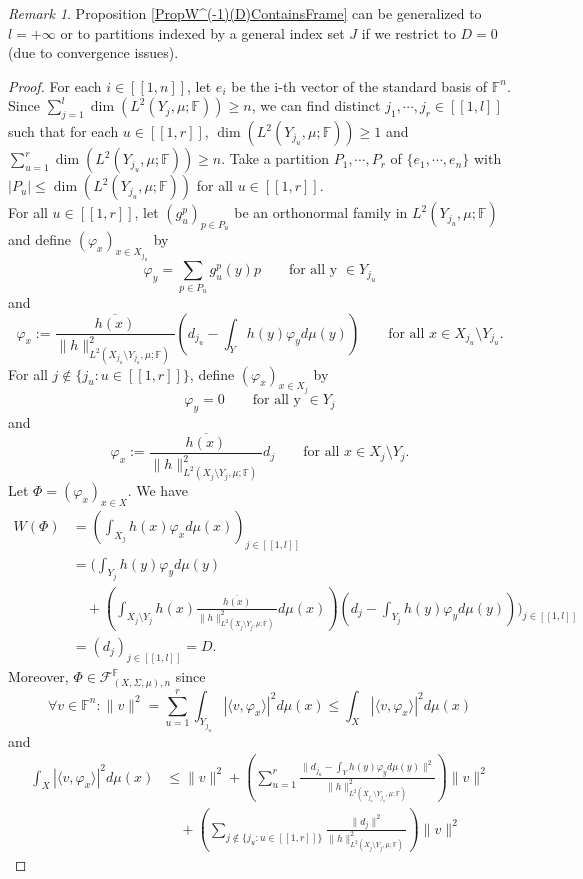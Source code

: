 \documentclass[a4paper,12pt]{article}
\theoremstyle{plain}
\theoremstyle{definition}
\theoremstyle{remark}
\newtheorem{remark}{Remark}[section]
\begin{document}
\begin{remark}
Proposition \ref{PropW^(-1)(D)ContainsFrame} can be generalized to $l = +\infty$ or to partitions indexed by a general index set $J$ if we restrict to $D=0$ (due to convergence issues).
\end{remark}

\begin{proof}
For each $i \in [\![1,n]\!]$, let $e_i$ be the i-th vector of the standard basis of $\mathbb{F}^n$. Since $\sum\limits_{j=1}^l \dim(L^2(Y_j,\mu;\mathbb{F})) \geq n$, we can find distinct $j_1, \cdots, j_r \in [\![1,l]\!]$ such that for each $u \in [\![1,r]\!]$, $\dim(L^2(Y_{j_u},\mu;\mathbb{F})) \geq 1$ and $\sum_{u=1}^r \dim(L^2(Y_{j_u},\mu;\mathbb{F})) \geq n$. Take a partition $P_1, \cdots, P_r$ of $\{e_1, \cdots, e_n\}$ with $|P_u| \leq \dim(L^2(Y_{j_u},\mu;\mathbb{F}))$ for all $u \in [\![1,r]\!]$. \\
For all $u \in [\![1,r]\!]$, let $(g_u^p)_{p \in P_u}$ be an orthonormal family in $L^2(Y_{j_u},\mu;\mathbb{F})$ and define $(\varphi_x)_{x \in X_{j_u}}$ by 
\[ \varphi_y = \sum_{p \in P_u} g_u^p(y)p \qquad \text{for all y } \in Y_{j_u} \]
and 
\[ \varphi_x := \frac{\overline{h(x)}}{\lVert h \rVert_{L^2(X_{j_u} \setminus Y_{j_u},\mu;\mathbb{F})}^2}\left(d_{j_u} - \int_Y h(y)\varphi_y d\mu(y) \right) \qquad \text{for all } x \in X_{j_u} \setminus Y_{j_u}. \]
For all $j \notin \{j_u : u \in [\![1,r]\!]\}$, define $(\varphi_x)_{x \in X_j}$ by 
\[ \varphi_y = 0 \qquad \text{for all y } \in Y_j \]
and 
\[ \varphi_x := \frac{\overline{h(x)}}{\lVert h \rVert_{L^2(X_j \setminus Y_j,\mu;\mathbb{F})}^2}d_j \qquad \text{for all } x \in X_j \setminus Y_j. \]
Let $\Phi = (\varphi_x)_{x \in X}$. We have 
\begin{align*}
W(\Phi) &= \left(\int_{X_j} h(x)\varphi_x d\mu(x) \right)_{j \in [\![1,l]\!]} \\
&= \Bigg( \int_{Y_j} h(y)\varphi_y d\mu(y) \\
&\quad + \left( \int_{X_j \setminus Y_j} h(x) \frac{\overline{h(x)}}{\lVert h \rVert_{L^2(X_j \setminus Y_j,\mu;\mathbb{F})}^2} d\mu(x) \right) \left( d_j -  \int_{Y_j} h(y)\varphi_y d\mu(y) \right) \Bigg)_{j \in [\![1,l]\!]} \\
&= (d_j)_{j \in [\![1,l]\!]} = D.
\end{align*}
Moreover, $\Phi \in \mathcal{F}_{(X,\Sigma,\mu),n}^\mathbb{F}$ since 
\[ \forall v \in \mathbb{F}^n : \lVert v \rVert^2 = \sum_{u=1}^r \int_{Y_{j_u}} | \langle v  , \varphi_x \rangle |^2 d\mu(x) \leq \int_X | \langle v , \varphi_x \rangle |^2 d\mu(x) \]
and 
\begin{align*}
\int_X | \langle v , \varphi_x \rangle |^2 d\mu(x) &\leq \lVert v \rVert^2 + \left( \sum_{u=1}^r \frac{\lVert d_{j_u} - \int_Y h(y)\varphi_y d\mu(y) \rVert^2}{\lVert h \rVert_{L^2(X_{j_u} \setminus Y_{j_u},\mu;\mathbb{F})}^2} \right) \lVert v \rVert^2 \\
&\quad + \left( \sum_{j \notin \{j_u : u\in [\![1,r]\!]\}} \frac{\lVert d_j \rVert^2}{\lVert h \rVert_{L^2(X_j \setminus Y_j,\mu;\mathbb{F})}^2} \right) \lVert v \rVert^2 
\end{align*}
\end{proof}
\end{document}
